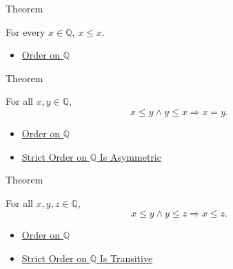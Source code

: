 \begin{theorembox}{Theorem}
\begin{theorem}
\label{thm:order-on-q-reflexive}
For every $x\in\mathbb{Q}$, $x\le x$.
\end{theorem}
\end{theorembox}

\begin{dependencies}
\begin{itemize}
  \item \hyperref[def:order-on-q]{Order on $\mathbb{Q}$}
\end{itemize}
\end{dependencies}

\begin{theorembox}{Theorem}
\begin{theorem}
\label{thm:order-on-q-antisymmetric}
For all $x,y\in\mathbb{Q}$,
\[
x\le y\land y\le x \Longrightarrow x=y.
\]
\end{theorem}
\end{theorembox}

\begin{dependencies}
\begin{itemize}
  \item \hyperref[def:order-on-q]{Order on $\mathbb{Q}$}
  \item \hyperref[thm:strict-order-on-q-asymmetric]{Strict Order on $\mathbb{Q}$ Is Asymmetric}
\end{itemize}
\end{dependencies}

\begin{theorembox}{Theorem}
\begin{theorem}
\label{thm:order-on-q-transitive}
For all $x,y,z\in\mathbb{Q}$,
\[
x\le y\land y\le z \Longrightarrow x\le z.
\]
\end{theorem}
\end{theorembox}

\begin{dependencies}
\begin{itemize}
  \item \hyperref[def:order-on-q]{Order on $\mathbb{Q}$}
  \item \hyperref[thm:strict-order-on-q-transitive]{Strict Order on $\mathbb{Q}$ Is Transitive}
\end{itemize}
\end{dependencies}

